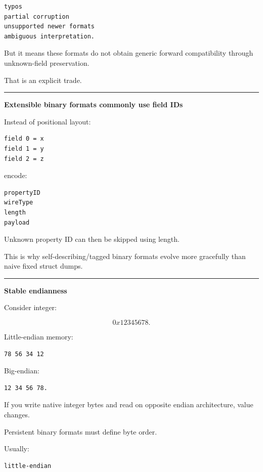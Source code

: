 \begin{verbatim}
typos
partial corruption
unsupported newer formats
ambiguous interpretation.
\end{verbatim}

But it means these formats do not obtain generic forward compatibility through unknown-field preservation.

That is an explicit trade.

\begin{center}\rule{0.5\linewidth}{0.5pt}\end{center}

\textbf{Extensible binary formats commonly use field IDs}

Instead of positional layout:

\begin{verbatim}
field 0 = x
field 1 = y
field 2 = z
\end{verbatim}

encode:

\begin{verbatim}
propertyID
wireType
length
payload
\end{verbatim}

Unknown property ID can then be skipped using length.

This is why self-describing/tagged binary formats evolve more gracefully than naive fixed struct dumps.

\begin{center}\rule{0.5\linewidth}{0.5pt}\end{center}

\textbf{Stable endianness}

Consider integer:

\[
0x12345678.
\]

Little-endian memory:

\begin{verbatim}
78 56 34 12
\end{verbatim}

Big-endian:

\begin{verbatim}
12 34 56 78.
\end{verbatim}

If you write native integer bytes and read on opposite endian architecture, value changes.

Persistent binary formats must define byte order.

Usually:

\begin{verbatim}
little-endian
\end{verbatim}

